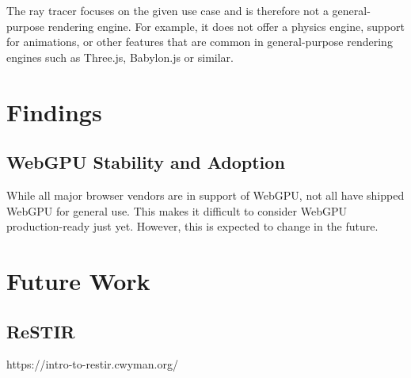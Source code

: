 
The ray tracer focuses on the given use case and is therefore not a general-purpose rendering engine. For example, it does not offer a physics engine, support for animations, or other features that are common in general-purpose rendering engines such as Three.js, Babylon.js or similar.

\section{Findings}
\subsection{WebGPU Stability and Adoption}

While all major browser vendors are in support of WebGPU, not all have shipped WebGPU for general use. This makes it difficult to consider WebGPU production-ready just yet. However, this is expected to change in the future.

\section{Future Work}
\subsection{ReSTIR}

https://intro-to-restir.cwyman.org/